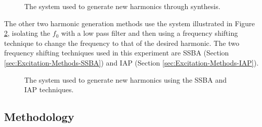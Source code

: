 		\begin{figure}[h!]
			\centering
			\caption{The system used to generate new harmonics through synthesis.}
			\label{fig:Synthesise}
		\end{figure}

		The other two harmonic generation methods use the system illustrated in Figure \ref{fig:FilterAndShift},
		isolating the $f_{0}$ with a low pass filter and then using a frequency shifting technique to change the
		frequency to that of the desired harmonic. The two frequency shifting techniques used in this experiment
		are SSBA (Section \ref{sec:Excitation-Methods-SSBA}) and IAP (Section \ref{sec:Excitation-Methods-IAP}).

		\begin{figure}[h!]
			\centering
			\caption{The system used to generate new harmonics using the SSBA and IAP techniques.}
			\label{fig:FilterAndShift}
		\end{figure}

	\subsection{Methodology}
	\label{sec:PerceptualExperiments-Reconstruction-Methodology}
